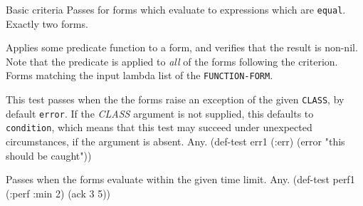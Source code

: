 \begin{criteriaGroup}{Basic criteria}{}
{Passes for forms which evaluate to expressions which are
\texttt{equal}.}
{Exactly two forms.}
{\noExpl}
{\noEx}{}

{Applies some predicate function to a form, and verifies that the
result is non-nil.  Note that the predicate is applied to \emph{all}
of the forms following the criterion.}
{Forms matching the input lambda list of the \texttt{FUNCTION-FORM}.}
{\noExpl}
{\multiEx}
{
 }

{This test passes when the the forms raise an exception of the given
\texttt{CLASS}, by default \texttt{error}.  If the \textit{CLASS} argument is
not supplied, this defaults to \texttt{condition}, which means that this test
may succeed under unexpected circumstances, if the argument is absent.}
{Any.}
{\noExpl}
{\singleEx}{(def-test err1 (:err) (error "this should be caught"))}

{Passes when the forms evaluate within the given time limit.}
{Any.}
{\noExpl}
{\singleEx}{(def-test perf1 (:perf :min 2) (ack 3 5))}

\end{criteriaGroup}

